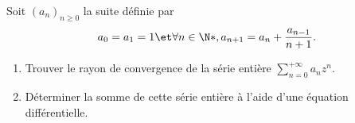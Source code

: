 \begin{enonce}
\begin{exercise}[ID={RMS 121-2 E792},subtitle={},tags={}]
  Soit $(a_n)_{n\ge0}$ la suite définie par
  \begin{equation*}
    a_0=a_1=1 \et \forall n\in\N*, a_{n+1}=a_n+\frac{a_{n-1}}{n+1}.
  \end{equation*}
  \begin{enumerate}
	\item Trouver le rayon de convergence de la série entière $\sum\limits_{n=0}^{+\infty} a_n z^n$.
	\item Déterminer la somme de cette série entière à l'aide d'une équation différentielle.
  \end{enumerate}
\end{exercise}
\begin{solution}
\end{solution}
\end{enonce}
